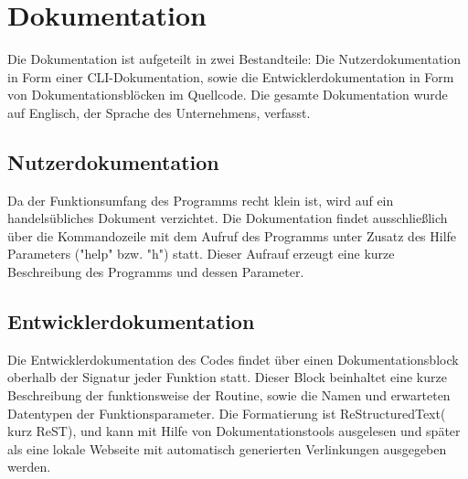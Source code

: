 \section{Dokumentation}
\label{section:dokumentationsphase}
Die Dokumentation ist aufgeteilt in zwei Bestandteile: Die Nutzerdokumentation
in Form einer CLI-Dokumentation, sowie die Entwicklerdokumentation in Form von
Dokumentationsblöcken im Quellcode. Die gesamte Dokumentation wurde auf Englisch,
der Sprache des Unternehmens, verfasst.

\subsection{Nutzerdokumentation}
Da der Funktionsumfang des Programms recht klein ist, wird auf ein handelsübliches
Dokument verzichtet. Die Dokumentation findet ausschließlich über die Kommandozeile mit dem Aufruf des Programms unter Zusatz des Hilfe Parameters ("\-\-help" bzw. "\-h") statt.
Dieser Aufrauf erzeugt eine kurze Beschreibung des Programms und dessen Parameter.

\subsection{Entwicklerdokumentation}
Die Entwicklerdokumentation des Codes findet über einen
Dokumentationsblock oberhalb der Signatur jeder Funktion statt. Dieser Block beinhaltet eine kurze Beschreibung der funktionsweise der Routine, sowie die Namen und erwarteten Datentypen der Funktionsparameter. Die Formatierung ist ReStructuredText( kurz ReST), und kann mit Hilfe von Dokumentationstools ausgelesen und später als eine lokale Webseite mit automatisch generierten Verlinkungen ausgegeben werden.
